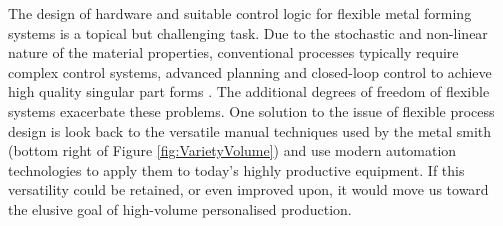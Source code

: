 
The design of hardware and suitable control logic for flexible metal forming systems is a topical but challenging task. Due to the stochastic and non-linear nature of the material properties, conventional processes typically require complex control systems, advanced planning and closed-loop control to achieve high quality singular part forms \citep{Allwood2016Closed-loopForming, Tekkaya2015MetalProperties, Polyblank2014Closed-loopProspectus}. The additional degrees of freedom of flexible systems exacerbate these problems. One solution to the issue of flexible process design is look back to the versatile manual techniques used by the metal smith (bottom right of Figure \ref{fig:VarietyVolume}) and use modern automation technologies to apply them to today’s highly productive equipment. If this versatility could be retained, or even improved upon, it would move us toward the elusive goal of high-volume personalised production. 



